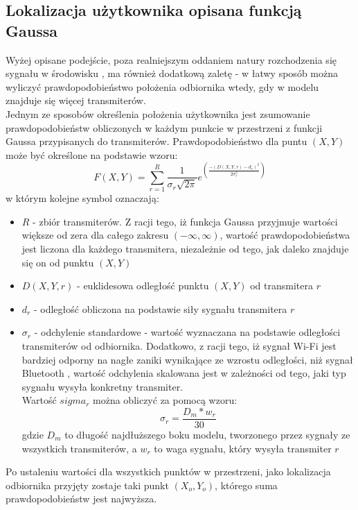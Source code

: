 \subsection{Lokalizacja użytkownika opisana funkcją Gaussa}
Wyżej opisane podejście, poza realniejszym oddaniem natury rozchodzenia się sygnału w środowisku \cite{TDECHN}, ma również dodatkową zaletę - w łatwy sposób można wyliczyć prawdopodobieństwo położenia odbiornika wtedy, gdy w modelu znajduje się więcej transmiterów.\\
Jednym ze sposobów określenia położenia użytkownika jest zsumowanie prawdopodobieństw obliczonych w każdym punkcie w przestrzeni z funkcji Gaussa przypisanych do transmiterów. Prawdopodobieństwo dla puntu $(X,Y)$ może być określone na podstawie wzoru:
\begin{equation}
F(X,Y) = \sum_{r=1}^{R} \frac{1}{\sigma_r\sqrt{2\pi}}e^{\left(\frac{-(D(X,Y,r)-d_r)^2}{2\sigma_r^2}\right)}
\end{equation}
w którym kolejne symbol oznaczają:
\begin{itemize}
	\item $R$ - zbiór transmiterów. Z racji tego, iż funkcja Gaussa przyjmuje wartości większe od zera dla całego zakresu $(-\infty,\infty)$, wartość prawdopodobieństwa jest liczona dla każdego transmitera, niezależnie od tego, jak daleko znajduje się on od punktu $(X,Y)$
	\item $D(X,Y,r)$ - euklidesowa odległość punktu $(X,Y)$ od transmitera $r$
	\item $d_r$ - odległość obliczona na podstawie siły sygnału transmitera $r$
	\item $\sigma_r$ - odchylenie standardowe - wartość wyznaczana na podstawie odległości transmiterów od odbiornika. Dodatkowo, z racji tego, iż sygnał Wi-Fi jest bardziej odporny na nagłe zaniki wynikające ze wzrostu odległości, niż sygnał Bluetooth \cite{BLUE}, wartość odchylenia skalowana jest w zależności od tego, jaki typ sygnału wysyła konkretny transmiter.\\
	Wartość $sigma_r$ można obliczyć za pomocą wzoru:
	\begin{equation}
		\sigma_r = \frac{D_m * w_r}{30}
	\end{equation}
	gdzie $D_m$ to długość najdłuższego boku modelu, tworzonego przez sygnały ze wszystkich transmiterów, a $w_r$ to waga sygnału, który wysyła transmiter $r$
\end{itemize}
Po ustaleniu wartości dla wszystkich punktów w przestrzeni, jako lokalizacja odbiornika przyjęty zostaje taki punkt $(X_o,Y_o)$, którego suma prawdopodobieństw jest najwyższa.
